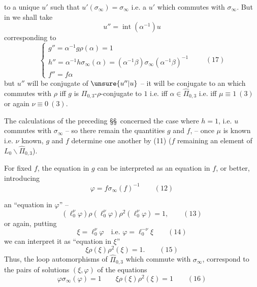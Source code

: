 
to a unique $u'$ such that $u'(\sigma_\infty)=\sigma_\infty$ i.e. a $u'$ which commutes with $\sigma_\infty$. But in  we shall take
\[
u''=\operatorname{int}(\alpha^{-1})u
\]
corresponding to
\[
\left\{\begin{array}{l}
g''=\alpha^{-1}g\rho(\alpha)=1\\
h''=\alpha^{-1}h\sigma_\infty(\alpha)=(\alpha^{-1}\beta)\sigma_\infty(\alpha^{-1}\beta)^{-1}\\
f''=f\alpha
\end{array}\right.
\qquad (17)
\]
but $u''$ will be conjugate  of $\unsure{u''|u}$ -- it will be conjugate to an   which commutes with $\rho$ iff $g$ is $\Pi_{0,3}$-$\rho$-conjugate to $1$ i.e. iff $\alpha\in\widehat{\Pi}_{0,3}$ i.e. iff $\mu\equiv1\ (3)$ or again $\nu\equiv0\ (3)$.

 The calculations of the preceding \S\S\ concerned the case where $h=1$, i.e. $u$ commutes with $\sigma_\infty$ -- so  there remain the quantities $g$ and $f$,  
-- once $\mu$ is known i.e. $\nu$ known, $g$ and $f$ determine one another by (11) ($f$ remaining an element of $L_0\backslash\widehat{\Pi}_{0,3}$).


For fixed $f$, the equation in $g$ can be interpreted as an equation in $f$, or better, introducing
\[
\varphi=f\sigma_\infty(f)^{-1}
\qquad (12)
\]



an ``equation in $\varphi$'' --
\[
(\ell_0^\nu\varphi)\rho(\ell_0^\nu\varphi)\rho^2(\ell_0^\nu\varphi)=1,
\qquad (13)
\]
or again, putting
\[
\boxed{\xi=\ell_0^\nu\varphi\quad\text{i.e. }\varphi=\ell_0^{-\nu}\xi}
\qquad (14)
\]
we can interpret it as ``equation in $\xi$''
\[
\xi\rho(\xi)\rho^2(\xi)=1.
\qquad (15)
\]
Thus, the loop automorphisms of $\widehat{\Pi}_{0,3}$ which commute with $\sigma_\infty$,  correspond to the pairs of solutions $(\xi,\varphi)$ of the equations
\[
\boxed{\varphi\sigma_\infty(\varphi)=1\qquad
\xi\rho(\xi)\rho^2(\xi)=1}
\qquad (16)
\]


